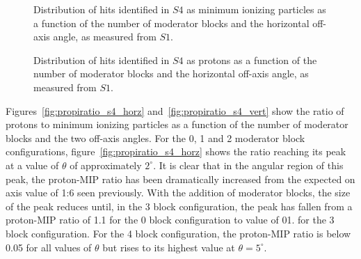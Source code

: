 \begin{figure}[!ht]
  \begin{minipage}[t]{0.48\textwidth}
    \begin{adjustbox}{max totalsize={\textwidth}{.35\textheight},center}
      
    \end{adjustbox}
    \caption{Distribution of hits identified in $\mathit{S4}$ as minimum ionizing particles as a function of the number of moderator blocks and the horizontal off-axis angle, as measured from $\mathit{S1}$.}
    \label{fig:thetas4mip}
  \end{minipage}
  \hspace{0.3cm}
  \begin{minipage}[t]{0.48\textwidth}
    \begin{adjustbox}{max totalsize={\textwidth}{.35\textheight},center}
      
    \end{adjustbox}
    \caption{Distribution of hits identified in $\mathit{S4}$ as protons as a function of the number of moderator blocks and the horizontal off-axis angle, as measured from $\mathit{S1}$.}
    \label{fig:thetas4pro}
  \end{minipage} 
\end{figure}	

Figures~\ref{fig:propiratio_s4_horz} and~\ref{fig:propiratio_s4_vert} show the ratio of protons to minimum ionizing particles as a function of the number of moderator blocks and the two off-axis angles.
For the 0, 1 and 2 moderator block configurations, figure~\ref{fig:propiratio_s4_horz} shows the ratio reaching its peak at a value of $\theta$ of approximately $2^{\circ}$.
It is clear that in the angular region of this peak, the proton-MIP ratio has been dramatically increased from the expected on axis value of 1:6 seen previously.
With the addition of moderator blocks, the size of the peak reduces until, in the 3 block configuration, the peak has fallen from a proton-MIP ratio of 1.1 for the 0 block configuration to value of 01. for the 3 block configuration. 
For the 4 block configuration, the proton-MIP ratio is below 0.05 for all values of $\theta$ but rises to its highest value at $\theta = 5^{\circ}$.

